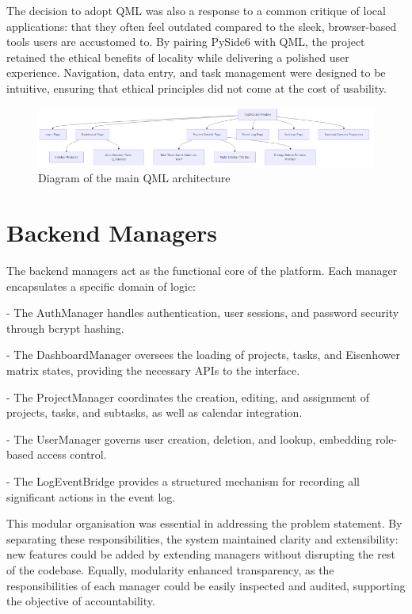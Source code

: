\documentclass{report}
\begin{document}
The decision to adopt QML was also a response to a common critique of local applications: that they often feel outdated compared to the sleek, browser-based tools users are accustomed to. 
By pairing PySide6 with QML, the project retained the ethical benefits of locality while delivering a polished user experience. 
Navigation, data entry, and task management were designed to be intuitive, ensuring that ethical principles did not come at the cost of usability.

\begin{figure}[h!]
  \centering
  \includegraphics[width=\linewidth,height=\textheight,keepaspectratio]{png_files/main_qml_architecture.png}
  \caption{Diagram of the main QML architecture}
    \label{fig:Main QML Architecture}
\end{figure}


\section{Backend Managers}

The backend managers act as the functional core of the platform. Each manager encapsulates a specific domain of logic:

- The AuthManager handles authentication, user sessions, and password security through bcrypt hashing.

- The DashboardManager oversees the loading of projects, tasks, and Eisenhower matrix states, providing the necessary APIs to the interface.

- The ProjectManager coordinates the creation, editing, and assignment of projects, tasks, and subtasks, as well as calendar integration.

- The UserManager governs user creation, deletion, and lookup, embedding role-based access control.

- The LogEventBridge provides a structured mechanism for recording all significant actions in the event log.

This modular organisation was essential in addressing the problem statement. 
By separating these responsibilities, the system maintained clarity and extensibility: new features could be added by extending managers without disrupting the rest of the codebase. 
Equally, modularity enhanced transparency, as the responsibilities of each manager could be easily inspected and audited, supporting the objective of accountability.
\end{document}
